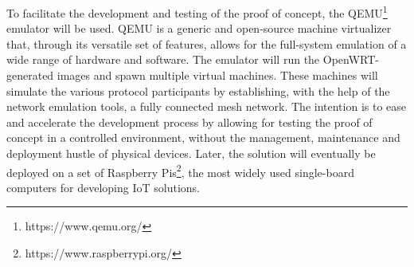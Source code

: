 To facilitate the development and testing of the proof of concept, the QEMU\footnote{https://www.qemu.org/} emulator will be used. QEMU is a generic and open-source machine virtualizer that, through its versatile set of features, allows for the full-system emulation of a wide range of hardware and software. The emulator will run the OpenWRT-generated images and spawn multiple virtual machines. These machines will simulate the various protocol participants by establishing, with the help of the network emulation tools, a fully connected mesh network. The intention is to ease and accelerate the development process by allowing for testing the proof of concept in a controlled environment, without the management, maintenance and deployment hustle of physical devices. Later, the solution will eventually be deployed on a set of Raspberry Pis\footnote{https://www.raspberrypi.org/}, the most widely used single-board computers for developing IoT solutions.
